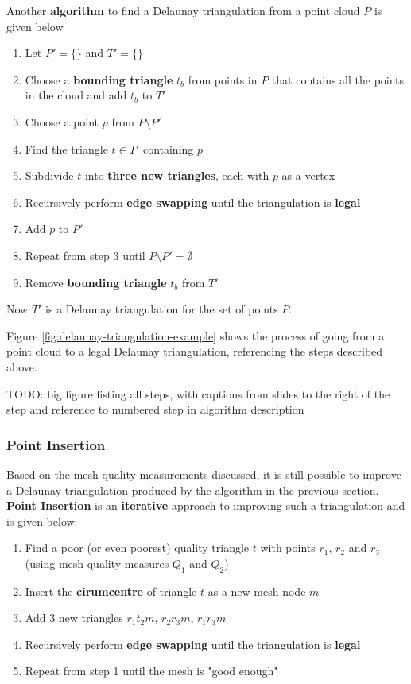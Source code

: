 \documentclass{article}
\begin{document}
Another \textbf{algorithm} to find a Delaunay triangulation from a point cloud $P$ is given below
\begin{enumerate}
	\item Let $P' = \lbrace \rbrace$ and $T' = \lbrace \rbrace$
	\item Choose a \textbf{bounding triangle} $t_b$ from points in $P$ that contains all the points in the cloud and add $t_b$ to $T'$
	\item Choose a point $p$ from $P \setminus P'$
	\item Find the triangle $t \in T'$ containing $p$
	\item Subdivide $t$ into \textbf{three new triangles}, each with $p$ as a vertex
	\item Recursively perform \textbf{edge swapping} until the triangulation is \textbf{legal}
	\item Add $p$ to $P'$
	\item Repeat from step 3 until $P \setminus P' = \emptyset$
	\item Remove \textbf{bounding triangle} $t_b$ from $T'$
\end{enumerate}
Now $T'$ is a Delaunay triangulation for the set of points $P$.

Figure \ref{fig:delaunay-triangulation-example} shows the process of going from a point cloud to a legal Delaunay triangulation, referencing the steps described above.

TODO: big figure listing all steps, with captions from slides to the right of the step and reference to numbered step in algorithm description

\subsubsection{Point Insertion}

Based on the mesh quality measurements discussed, it is still possible to improve a Delaunay triangulation produced by the algorithm in the previous section. \textbf{Point Insertion} is an \textbf{iterative} approach to improving such a triangulation and is given below:
\begin{enumerate}
	\item Find a poor (or even poorest) quality triangle $t$ with points $r_1$, $r_2$ and $r_3$ (using mesh quality measures $Q_1$ and $Q_2$)
	\item Insert the \textbf{cirumcentre} of triangle $t$ as a new mesh node $m$
	\item Add 3 new triangles $r_1t_2m$, $r_2r_3m$, $r_1r_3m$
	\item Recursively perform \textbf{edge swapping} until the triangulation is \textbf{legal}
	\item Repeat from step 1 until the mesh is "good enough"
\end{enumerate}
\end{document}
